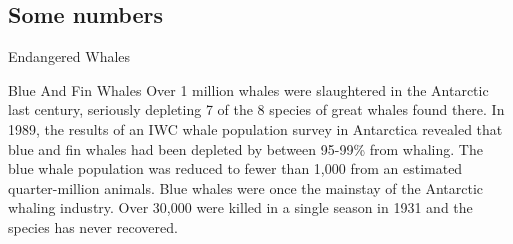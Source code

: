 \documentclass[hyperref={unicode}]{beamer}
\begin{document}
\begin{CJK}{UTF8}{gkai}
\section{Some numbers}
\begin{frame}{Endangered Whales}
  \begin{block}{Blue And Fin Whales}
    Over 1 million whales were slaughtered in the Antarctic last century, seriously depleting 7 of the 8 species of great whales found there. In 1989, the results of an IWC whale population survey in Antarctica revealed that blue and fin whales had been depleted by between \alert{95-99\%} from whaling. The blue whale population was reduced to fewer than \alert{1,000} from an estimated quarter-million animals. Blue whales were once the mainstay of the Antarctic whaling industry. Over \alert{30,000} were killed in a single season in 1931 and the species has never recovered.
  \end{block}
\end{frame}


\end{CJK}
\end{document}
